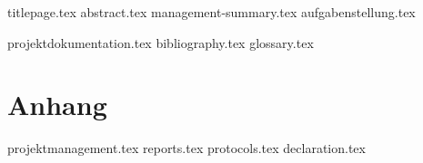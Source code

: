 \documentclass{scrbook}
\begin{document}
    \frontmatter
          {titlepage.tex}
          \clearpage
          {abstract.tex}
		  {management-summary.tex}
		  {aufgabenstellung.tex}

    \tableofcontents

    \listoffigures

    \listoftables

	\renewcommand\listoflistingscaption{Auflistungsverzeichnis}
	\listoflistings

    \mainmatter
      {projektdokumentation.tex}
	  {bibliography.tex}
      {glossary.tex}
      
    \backmatter
      \part{Anhang}
      {projektmanagement.tex}
      {reports.tex}
      {protocols.tex}
      {declaration.tex}
\end{document}
